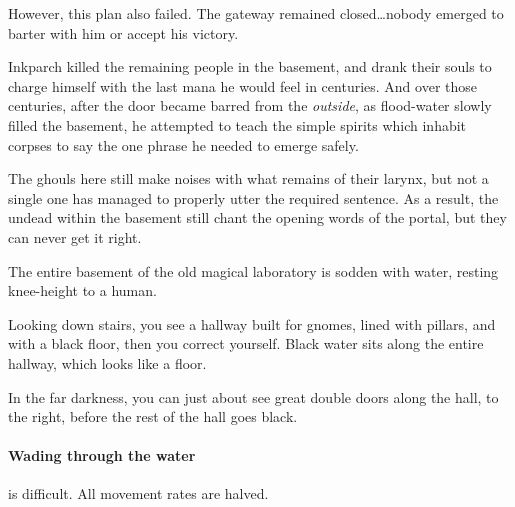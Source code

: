 \begin{exampletext}
  However, this plan also failed.
  The gateway remained closed\ldots nobody emerged to barter with him or accept his victory.

  Inkparch killed the remaining people in the basement, and drank their souls to charge himself with the last mana he would feel in centuries.
  And over those centuries, after the door became barred from the \emph{outside}, as flood-water slowly filled the basement, he attempted to teach the simple spirits which inhabit corpses to say the one phrase he needed to emerge safely.

  The ghouls here still make noises with what remains of their larynx, but not a single one has managed to properly utter the required sentence.
  As a result, the undead within the basement still chant the opening words of the portal, but they can never get it right.
\end{exampletext}

The entire basement of the old magical laboratory is sodden with water, resting knee-height to a human.

\begin{boxtext}
  Looking down stairs, you see a hallway built for gnomes, lined with pillars, and with a black floor, then you correct yourself.
  Black water sits along the entire hallway, which looks like a floor.

  In the far darkness, you can just about see great double doors along the hall, to the right, before the rest of the hall goes black.

\end{boxtext}


\paragraph{Wading through the water}
is difficult.
All movement rates are halved.

